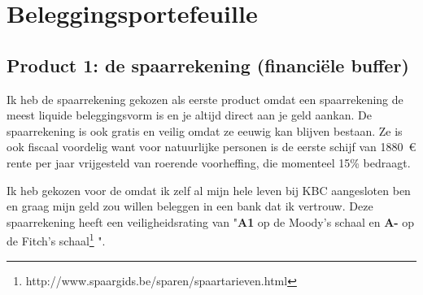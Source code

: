 \chapter{Beleggingsportefeuille}
\label{hoofdstuk:beleggingsportefeuille}
\thispagestyle{chapternohead}




\begin{comment}
\begin{figure}[!htbp]
	\centering
	\texttt{[image: images/producten/overzichtbelegdbedrag]}
	\caption{Overzicht verdeling van het verdeelde bedrag per product in percentage}	
\label{fig:overzichtbelegdbedrag}
	\end{figure}
\end{comment}

\section{Product 1: de spaarrekening (financiële buffer)}

Ik heb de spaarrekening gekozen als eerste product omdat een spaarrekening de meest liquide beleggingsvorm is en je altijd direct aan je geld aankan. De spaarrekening is ook gratis en veilig omdat ze eeuwig kan blijven bestaan. Ze is ook fiscaal voordelig want voor natuurlijke personen is de eerste schijf van 1880~\euro{} rente per jaar vrijgesteld van roerende voorheffing, die momenteel 15\% bedraagt.

Ik heb gekozen voor de  omdat ik zelf al mijn hele leven bij KBC aangesloten ben en graag mijn geld zou willen beleggen in een bank dat ik vertrouw. Deze spaarrekening heeft een veiligheidsrating van "\textbf{A1} op de Moody's schaal en \textbf{A-} op de Fitch's schaal\footnote{http://www.spaargids.be/sparen/spaartarieven.html} ".

